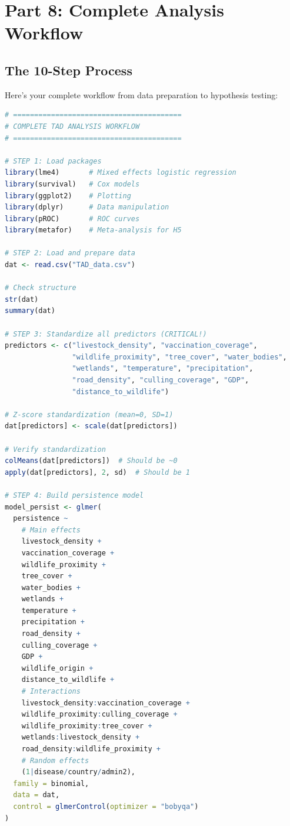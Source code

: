 \documentclass[11pt,a4paper]{article}
\begin{document}
\section{Part 8: Complete Analysis Workflow}

\subsection{The 10-Step Process}

Here's your complete workflow from data preparation to hypothesis testing:

\begin{rcode}
\begin{lstlisting}[language=R]
# ========================================
# COMPLETE TAD ANALYSIS WORKFLOW
# ========================================

# STEP 1: Load packages
library(lme4)       # Mixed effects logistic regression
library(survival)   # Cox models
library(ggplot2)    # Plotting
library(dplyr)      # Data manipulation
library(pROC)       # ROC curves
library(metafor)    # Meta-analysis for H5

# STEP 2: Load and prepare data
dat <- read.csv("TAD_data.csv")

# Check structure
str(dat)
summary(dat)

# STEP 3: Standardize all predictors (CRITICAL!)
predictors <- c("livestock_density", "vaccination_coverage",
                "wildlife_proximity", "tree_cover", "water_bodies",
                "wetlands", "temperature", "precipitation",
                "road_density", "culling_coverage", "GDP",
                "distance_to_wildlife")

# Z-score standardization (mean=0, SD=1)
dat[predictors] <- scale(dat[predictors])

# Verify standardization
colMeans(dat[predictors])  # Should be ~0
apply(dat[predictors], 2, sd)  # Should be 1

# STEP 4: Build persistence model
model_persist <- glmer(
  persistence ~ 
    # Main effects
    livestock_density + 
    vaccination_coverage + 
    wildlife_proximity + 
    tree_cover + 
    water_bodies + 
    wetlands +
    temperature + 
    precipitation + 
    road_density + 
    culling_coverage + 
    GDP + 
    wildlife_origin + 
    distance_to_wildlife + 
    # Interactions
    livestock_density:vaccination_coverage +
    wildlife_proximity:culling_coverage +
    wildlife_proximity:tree_cover +
    wetlands:livestock_density +
    road_density:wildlife_proximity +
    # Random effects
    (1|disease/country/admin2),
  family = binomial,
  data = dat,
  control = glmerControl(optimizer = "bobyqa")
)


\end{lstlisting}
\end{rcode}
\end{document}
